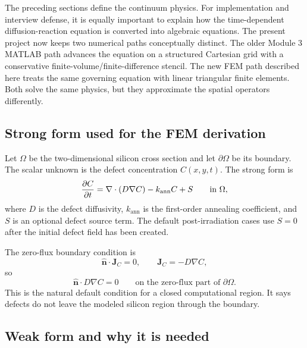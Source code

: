 \documentclass[11pt]{article}
\begin{document}
The preceding sections define the continuum physics. For implementation and interview defense, it is equally important to explain how the time-dependent diffusion-reaction equation is converted into algebraic equations. The present project now keeps two numerical paths conceptually distinct. The older Module 3 MATLAB path advances the equation on a structured Cartesian grid with a conservative finite-volume/finite-difference stencil. The new FEM path described here treats the same governing equation with linear triangular finite elements. Both solve the same physics, but they approximate the spatial operators differently.

\subsection{Strong form used for the FEM derivation}

Let $\Omega$ be the two-dimensional silicon cross section and let $\partial\Omega$ be its boundary. The scalar unknown is the defect concentration $C(x,y,t)$. The strong form is
\begin{equation}
\pdv{C}{t}
=
\nabla\cdot\left(D\nabla C\right)-k_{\mathrm{ann}}C+S
\qquad \text{in } \Omega,
\end{equation}
where $D$ is the defect diffusivity, $k_{\mathrm{ann}}$ is the first-order annealing coefficient, and $S$ is an optional defect source term. The default post-irradiation cases use $S=0$ after the initial defect field has been created.

The zero-flux boundary condition is
\begin{equation}
\hat{\mathbf{n}}\cdot\mathbf{J}_C = 0,
\qquad
\mathbf{J}_C=-D\nabla C,
\end{equation}
so
\begin{equation}
\hat{\mathbf{n}}\cdot D\nabla C = 0
\qquad \text{on the zero-flux part of } \partial\Omega.
\end{equation}
This is the natural default condition for a closed computational region. It says defects do not leave the modeled silicon region through the boundary.

\subsection{Weak form and why it is needed}
\end{document}
